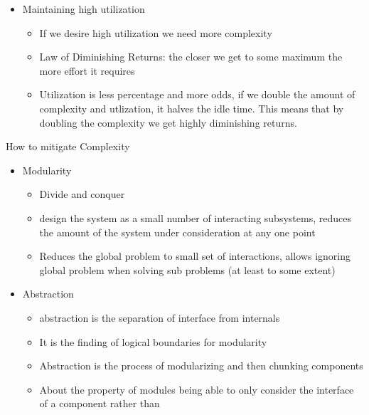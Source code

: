 \documentclass{report}
\begin{document}
\begin{description}
\begin{itemize}
            \item Maintaining high utilization
                \begin{itemize}
                    \item If we desire high utilization we need more complexity
                    \item Law of Diminishing Returns: the closer we get to some maximum
                        the more effort it requires
                    \item Utilization is less percentage and more odds, if we double
                        the amount of complexity and utlization, it halves the idle
                        time. This means that by doubling the complexity we get
                        highly diminishing returns.
                \end{itemize}
        \end{itemize}
    \item How to mitigate Complexity
        \begin{itemize}
            \item Modularity
                \begin{itemize}
                    \item Divide and conquer
                    \item design the system as a small number of interacting subsystems,
                        reduces the amount of the system under consideration at any
                        one point
                    \item Reduces the global problem to small set of interactions,
                        allows ignoring global problem when solving sub problems
                        (at least to some extent)
                \end{itemize}
            \item Abstraction
                \begin{itemize}
                    \item abstraction is the separation of interface from internals
                    \item It is the finding of logical boundaries for modularity
                    \item Abstraction is the process of modularizing and then
                        chunking components
                    \item About the property of modules being able to only
                        consider the interface of a component rather than

\end{itemize}
\end{itemize}
\end{description}
\end{document}
